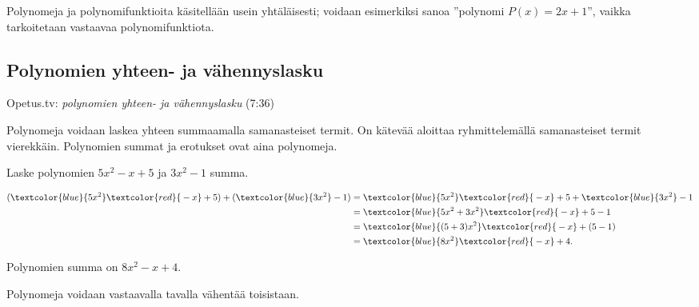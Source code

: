 Polynomeja ja polynomifunktioita käsitellään usein yhtäläisesti;
voidaan esimerkiksi sanoa ''polynomi $P(x)=2x+1$'',
vaikka tarkoitetaan vastaavaa polynomifunktiota.

\subsection*{Polynomien yhteen- ja vähennyslasku}

{Opetus.tv: \emph{polynomien yhteen- ja vähennyslasku} (7:36)}

Polynomeja voidaan laskea yhteen summaamalla samanasteiset termit.
On kätevää aloittaa ryhmittelemällä samanasteiset termit vierekkäin. Polynomien summat ja erotukset ovat aina polynomeja.

\begin{esimerkki}
Laske polynomien $5x^2-x+5$ ja $3x^2-1$ summa.
    \begin{esimratk}
        \begin{align*}
            (\textcolor{blue}{5x^2} \textcolor{red}{{}-x} + 5) + (\textcolor{blue}{3x^2} -1) 
            &=\textcolor{blue}{5x^2} \textcolor{red}{{}-x} + 5 + \textcolor{blue}{3x^2} -1 \\
            &=\textcolor{blue}{5x^2+3x^2} \textcolor{red}{{}-x} +5-1\\
            &=\textcolor{blue}{(5+3)x^2} \textcolor{red}{{}-x}+(5-1)\\
            &=\textcolor{blue}{8x^2} \textcolor{red}{{}-x}+4.
        \end{align*}
    \end{esimratk}
    \begin{esimvast}
        Polynomien summa on $8x^2-x+4$.
    \end{esimvast}
\end{esimerkki}

Polynomeja voidaan vastaavalla tavalla vähentää toisistaan.

